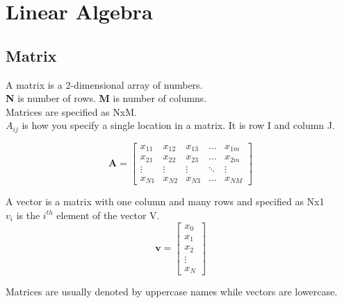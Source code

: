 
\section{Linear Algebra}

\subsection{Matrix}

A matrix is a 2-dimensional array of numbers.\\

\textbf{N} is number of rows.  \textbf{M} is number of columns.\\

Matrices are specified as NxM.\\

$A_{ij}$ is how you specify a single location in a matrix.  It is row I and column J.



\begin{equation}
  \textbf{A} = \left[
    \begin{matrix}
      x_{11} & x_{12} & x_{13} & \dots  & x_{1m} \\
      x_{21} & x_{22} & x_{23} & \dots  & x_{2m} \\
      \vdots & \vdots & \vdots & \ddots & \vdots \\
      x_{N1} & x_{N2} & x_{N3} & \dots  & x_{NM}
    \end{matrix}
    \right]
  \label{eqn:BasicMatrix}
\end{equation}

A vector is a matrix with one column and many rows and specified as Nx1\\

$v_i$ is the $i^{th}$ element of the vector V.\\

\begin{equation}
  \textbf{{v}} = \left[
    \begin{matrix}
      x_{0} \\
      x_{1} \\
      x_{2} \\
      \vdots \\
      x_{N}
    \end{matrix}
    \right]
  \label{eqn:BasicVector}
\end{equation}

Matrices are usually denoted by uppercase names while vectors are lowercase.\\

